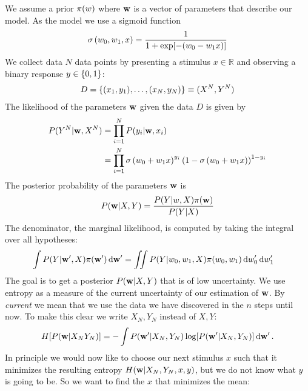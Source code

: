

We assume a prior ${\pi(w)}$ where ${\bf w}$ is a vector of parameters that describe our model.
As the model we use a sigmoid function
\begin{align}
	{\sigma \left(w_0, w_1, x\right)} = \frac{1}{1 + \exp[-(w_0 - w_1 x)]}
\end{align}
We collect data $N$ data points by presenting a stimulus $x \in \mathbb{R}$ and observing a binary response $y \in \left\{ 0, 1 \right\}$:
\begin{align}
	 D = \left\{ (x_1, y_1), \dots, (x_N, y_N) \right\} \equiv (X^N, Y^N)
\end{align}
The likelihood of the parameters ${\bf w}$ given the data $D$ is given by
\begin{align}
	{P(Y^N | {\bf w}, X^N)}
	&= \prod_{i=1}^N {P(y_i | {\bf w}, x_i)} \\
	&= \prod_{i=1}^N {\sigma \left(w_0 + w_1 x\right)}^{y_i}
		\left( 1 - {\sigma \left(w_0 + w_1 x\right)} \right)^{1-y_i}
\end{align}
The posterior probability of the parameters ${\bf w}$ is
\begin{align}
	{P({\bf w} | X, Y)} = \frac{{P(Y | w, X)} {\pi({\bf w})}}{{P(Y | X)}}
\end{align}
The denominator, \ie the marginal likelihood, is computed by taking the integral over all hypotheses:
\begin{align}
	\int {P(Y | {\bf w}', X)} {\pi({\bf w}')} \,\mathrm{d} {\bf w}'
	&= \iint {P(Y | w_0, w_1, X)} {\pi(w_0, w_1)} \,\mathrm{d} w_0' \,\mathrm{d} w_1'
\end{align}
The goal is to get a posterior ${P({\bf w} | X, Y)}$ that is of low uncertainty. We use entropy as a measure of the current uncertainty of our estimation of ${\bf w}$. By \emph{current} we mean that we use the data we have discovered in the $n$ steps until now. To make this clear we write $X_N, Y_N$ instead of $X, Y$:
\begin{align}
	H[{P({\bf w} | X_N Y_N)}] = - \int {P({\bf w}' | X_N, Y_N)} \log[{P({\bf w}' | X_N, Y_N)}] \,\mathrm{d} {\bf w}' \,.
\end{align}
In principle we would now like to choose our next stimulus $x$ such that it minimizes the resulting entropy $H({\bf w} | X_N, Y_N, x, y)$, but we do not know what $y$ is going to be. So we want to find the $x$ that minimizes the mean:
